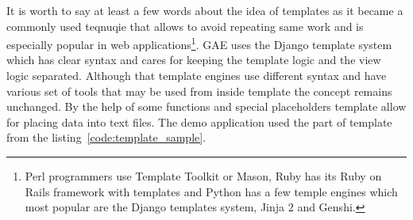 It is worth to say at least a few words about the idea of templates as it  became a commonly used teqnuqie that allows to avoid repeating same work and is especially popular in web applications\footnote{Perl programmers use Template Toolkit or Mason, Ruby has its Ruby on Rails framework with templates  and Python has a few temple engines which most popular are the Django templates system, Jinja 2 and Genshi.}. GAE uses the Django template system which has clear syntax and cares for keeping the template logic and the view logic separated. Although  that template engines use different syntax and have various set of tools that may be used from inside template the concept remains unchanged. By the help of some functions and special placeholders template allow for placing data into text files. The demo application used the part of template from the listing~\ref{code:template_sample}. 

